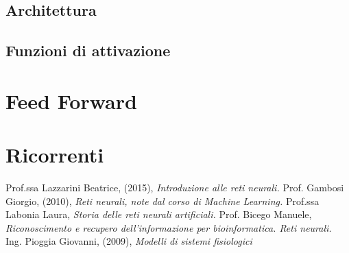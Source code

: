 \documentclass[12pt,a4paper,oneside]{book}
\begin{document}
		\section{Architettura}
		\section{Funzioni di attivazione}
	
	\chapter{Feed Forward}
	\chapter{Ricorrenti}

\clearpage 
\begin{thebibliography}{9} 
	 Prof.ssa Lazzarini Beatrice, (2015), \emph{Introduzione alle reti neurali.}
	 Prof. Gambosi Giorgio, (2010), \emph{Reti neurali, note dal corso di Machine Learning.}
	 Prof.ssa Labonia Laura, \emph{Storia delle reti neurali artificiali.}
	 Prof. Bicego Manuele, \emph{Riconoscimento e recupero dell’informazione per bioinformatica. Reti neurali.}
	 Ing. Pioggia Giovanni, (2009), \emph{Modelli di sistemi fisiologici}
 \end{thebibliography}
	
\end{document}

